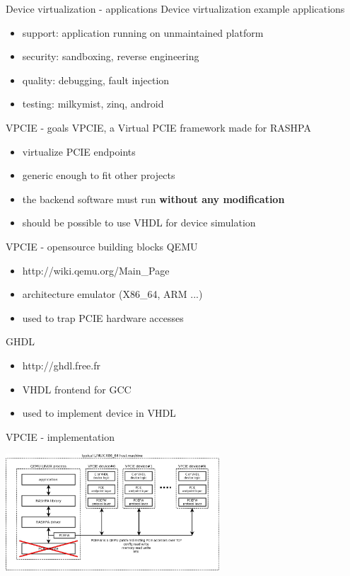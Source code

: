\documentclass{beamer}
\begin{document}
\begin{frame}{Device virtualization - applications}
  Device virtualization example applications
  \begin{itemize}
  \item support: application running on unmaintained platform
  \item security: sandboxing, reverse engineering
  \item quality: debugging, fault injection
  \item testing: milkymist, zinq, android
  \end{itemize}
\end{frame}

\begin{frame}{VPCIE - goals}
  VPCIE, a Virtual PCIE framework made for RASHPA
  \begin{itemize}
  \item virtualize PCIE endpoints
  \item generic enough to fit other projects
  \item the backend software must run \textbf{without any modification}
  \item should be possible to use VHDL for device simulation
  \end{itemize}
\end{frame}

\begin{frame}{VPCIE - opensource building blocks}
  QEMU 
  \begin{itemize}
  \item http://wiki.qemu.org/Main\_Page
  \item architecture emulator (X86\_64, ARM ...)
  \item used to trap PCIE hardware accesses
  \end{itemize}
  GHDL
  \begin{itemize}
  \item http://ghdl.free.fr
  \item VHDL frontend for GCC
  \item used to implement device in VHDL
  \end{itemize}
\end{frame}

\begin{frame}{VPCIE - implementation}
  \begin{center}
  \includegraphics[width=80mm]{pic/dv_implem/main.jpeg}
  \end{center}
\end{frame}
\end{document}
